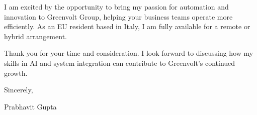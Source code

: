\documentclass[11pt,a4paper]{letter}
\begin{document}
I am excited by the opportunity to bring my passion for automation and innovation to Greenvolt Group, helping your business teams operate more efficiently. As an EU resident based in Italy, I am fully available for a remote or hybrid arrangement. 

Thank you for your time and consideration. I look forward to discussing how my skills in AI and system integration can contribute to Greenvolt's continued growth.

Sincerely,

Prabhavit Gupta
\end{document}
